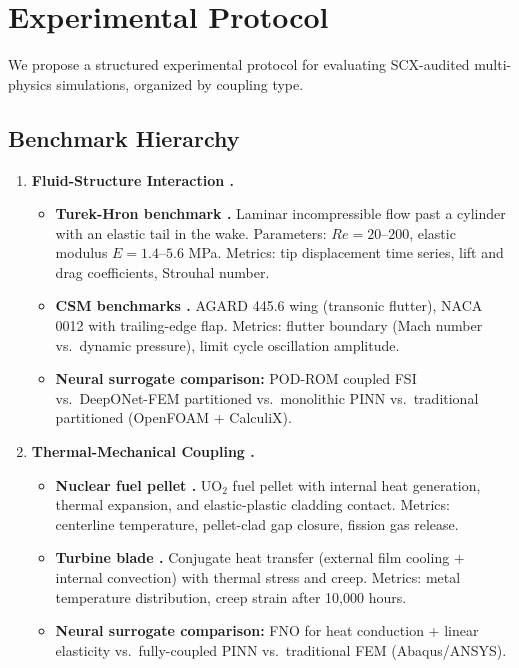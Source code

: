 \documentclass[11pt,a4paper]{article}
\theoremstyle{definition}
\begin{document}
\section{Experimental Protocol }
\label{sec:experiment}

We propose a structured experimental protocol for evaluating SCX-audited multi-physics simulations, organized by coupling type.

\subsection{Benchmark Hierarchy}

\begin{enumerate}[label=\textbf{BM\arabic*:},leftmargin=*]

    \item \textbf{ Fluid-Structure Interaction .}
    \begin{itemize}
        \item \textbf{Turek-Hron benchmark \cite{Turek2006}.} Laminar incompressible flow past a cylinder with an elastic tail in the wake. Parameters: $Re = 20$--$200$, elastic modulus $E = 1.4$--$5.6$ MPa. Metrics: tip displacement time series, lift and drag coefficients, Strouhal number.
        \item \textbf{CSM benchmarks \cite{CSMbenchmarks}.} AGARD 445.6 wing (transonic flutter), NACA 0012 with trailing-edge flap. Metrics: flutter boundary (Mach number vs.\ dynamic pressure), limit cycle oscillation amplitude.
        \item \textbf{Neural surrogate comparison:} POD-ROM coupled FSI \cite{Fresca2021} vs.\ DeepONet-FEM partitioned \cite{Lu2021} vs.\ monolithic PINN \cite{Raissi2019} vs.\ traditional partitioned (OpenFOAM + CalculiX).
    \end{itemize}

    \item \textbf{ Thermal-Mechanical Coupling .}
    \begin{itemize}
        \item \textbf{Nuclear fuel pellet \cite{NuclearFuel}.} UO$_2$ fuel pellet with internal heat generation, thermal expansion, and elastic-plastic cladding contact. Metrics: centerline temperature, pellet-clad gap closure, fission gas release.
        \item \textbf{Turbine blade \cite{TurbineBlade}.} Conjugate heat transfer (external film cooling + internal convection) with thermal stress and creep. Metrics: metal temperature distribution, creep strain after 10,000 hours.
        \item \textbf{Neural surrogate comparison:} FNO for heat conduction \cite{Li2021} + linear elasticity vs.\ fully-coupled PINN vs.\ traditional FEM (Abaqus/ANSYS).
    \end{itemize}


\end{enumerate}
\end{document}

